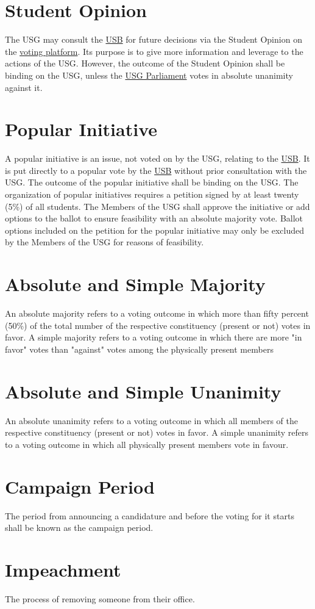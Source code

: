 \section{Student Opinion}
\label{StudentOpiniondef}
The USG may consult the \hyperref[studentbody]{USB} for future decisions via the Student Opinion on the \href{https://vote.jacobs.university/}{voting platform}. Its purpose is to give more information and leverage to the actions of the USG. However, the outcome of the Student Opinion shall be binding on the USG, unless the \hyperref[USGParliamentDef]{USG Parliament} votes in absolute unanimity against it.

\section{Popular Initiative} 
 A popular initiative is an issue, not voted on by the USG, relating to the \hyperref[studentbody]{USB}. It is put directly to a popular vote by the \hyperref[studentbody]{USB} without prior consultation with the USG. The outcome of the popular initiative shall be binding on the USG. The organization of popular initiatives requires a petition signed by at least twenty (5\%)  of all students. The Members of the USG shall approve the initiative or add options to the ballot to ensure feasibility with an absolute majority vote. Ballot options included on the petition for the popular initiative may only be excluded by the Members of the USG for reasons of feasibility.

\section{} 

\section{Absolute and Simple Majority}
An absolute majority refers to a voting outcome in which more than fifty percent (50\%) of the total number of the respective constituency (present or not) votes in favor.  A simple majority refers to a voting outcome in which there are more "in favor" votes than "against" votes among the physically present members

\section{Absolute and Simple Unanimity}
An absolute unanimity refers to a voting outcome in which all members of the respective constituency (present or not) votes in favor. A simple unanimity refers to a voting outcome in which all physically present members vote in favour.


\section{Campaign Period}
The period from announcing a candidature and before the voting for it starts shall be known as the campaign period.

\section{Impeachment}
The process of removing someone from their office.